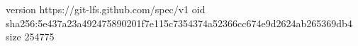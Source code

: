 version https://git-lfs.github.com/spec/v1
oid sha256:5e437a23a492475890201f7e115c7354374a52366cc674e9d2624ab265369db4
size 254775
